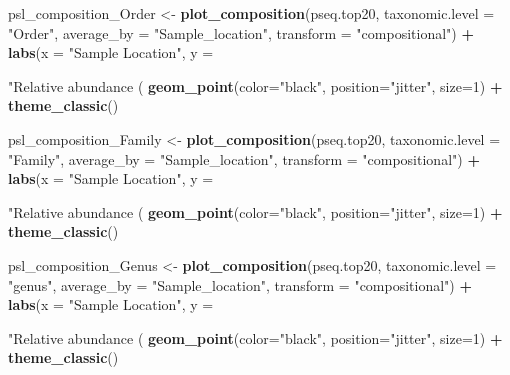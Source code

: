 \documentclass[]{article}
\newenvironment{Shaded}{\begin{snugshade}}{\end{snugshade}}
\newcommand{\DataTypeTok}[1]{\textcolor[rgb]{0.13,0.29,0.53}{#1}}
\newcommand{\DecValTok}[1]{\textcolor[rgb]{0.00,0.00,0.81}{#1}}
\newcommand{\KeywordTok}[1]{\textcolor[rgb]{0.13,0.29,0.53}{\textbf{#1}}}
\newcommand{\NormalTok}[1]{#1}
\newcommand{\OperatorTok}[1]{\textcolor[rgb]{0.81,0.36,0.00}{\textbf{#1}}}
\newcommand{\StringTok}[1]{\textcolor[rgb]{0.31,0.60,0.02}{#1}}
\begin{document}
\begin{Shaded}
\begin{Highlighting}[]
{{{\NormalTok{psl_composition_Order <-}\StringTok{ }\KeywordTok{plot_composition}\NormalTok{(pseq.top20, }\DataTypeTok{taxonomic.level =} \StringTok{"Order"}\NormalTok{, }\DataTypeTok{average_by =} \StringTok{"Sample_location"}\NormalTok{, }\DataTypeTok{transform =} \StringTok{"compositional"}\NormalTok{) }\OperatorTok{+}
\StringTok{  }\KeywordTok{labs}\NormalTok{(}\DataTypeTok{x =} \StringTok{"Sample Location"}\NormalTok{, }\DataTypeTok{y =} \StringTok{"Relative abundance (%)"}\NormalTok{, }\DataTypeTok{title =} \StringTok{"Relative abundance data"}\NormalTok{, }\DataTypeTok{subtitle =} \StringTok{"Order"}\NormalTok{) }\OperatorTok{+}
\StringTok{  }\KeywordTok{geom_point}\NormalTok{(}\DataTypeTok{color=}\StringTok{"black"}\NormalTok{, }\DataTypeTok{position=}\StringTok{"jitter"}\NormalTok{, }\DataTypeTok{size=}\DecValTok{1}\NormalTok{) }\OperatorTok{+}\StringTok{ }\KeywordTok{theme_classic}\NormalTok{()}

\NormalTok{psl_composition_Family <-}\StringTok{ }\KeywordTok{plot_composition}\NormalTok{(pseq.top20, }\DataTypeTok{taxonomic.level =} \StringTok{"Family"}\NormalTok{, }\DataTypeTok{average_by =} \StringTok{"Sample_location"}\NormalTok{, }\DataTypeTok{transform =} \StringTok{"compositional"}\NormalTok{) }\OperatorTok{+}
\StringTok{     }\KeywordTok{labs}\NormalTok{(}\DataTypeTok{x =} \StringTok{"Sample Location"}\NormalTok{, }\DataTypeTok{y =} \StringTok{"Relative abundance (%)"}\NormalTok{, }\DataTypeTok{title =} \StringTok{"Relative abundance data"}\NormalTok{, }\DataTypeTok{subtitle =} \StringTok{"Family"}\NormalTok{) }\OperatorTok{+}
\StringTok{     }\KeywordTok{geom_point}\NormalTok{(}\DataTypeTok{color=}\StringTok{"black"}\NormalTok{, }\DataTypeTok{position=}\StringTok{"jitter"}\NormalTok{, }\DataTypeTok{size=}\DecValTok{1}\NormalTok{) }\OperatorTok{+}\StringTok{ }\KeywordTok{theme_classic}\NormalTok{()}

\NormalTok{psl_composition_Genus <-}\StringTok{ }\KeywordTok{plot_composition}\NormalTok{(pseq.top20, }\DataTypeTok{taxonomic.level =} \StringTok{"genus"}\NormalTok{, }\DataTypeTok{average_by =} \StringTok{"Sample_location"}\NormalTok{, }\DataTypeTok{transform =} \StringTok{"compositional"}\NormalTok{) }\OperatorTok{+}
\StringTok{  }\KeywordTok{labs}\NormalTok{(}\DataTypeTok{x =} \StringTok{"Sample Location"}\NormalTok{, }\DataTypeTok{y =} \StringTok{"Relative abundance (%)"}\NormalTok{, }\DataTypeTok{title =} \StringTok{"Relative abundance data"}\NormalTok{, }\DataTypeTok{subtitle =} \StringTok{"Genus"}\NormalTok{) }\OperatorTok{+}
\StringTok{  }\KeywordTok{geom_point}\NormalTok{(}\DataTypeTok{color=}\StringTok{"black"}\NormalTok{, }\DataTypeTok{position=}\StringTok{"jitter"}\NormalTok{, }\DataTypeTok{size=}\DecValTok{1}\NormalTok{) }\OperatorTok{+}\StringTok{ }\KeywordTok{theme_classic}\NormalTok{()}

}}}}}}
\end{Highlighting}
\end{Shaded}
\end{document}
